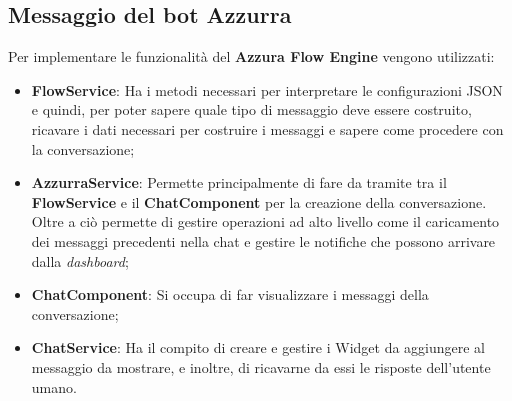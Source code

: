\subsection{Messaggio del bot Azzurra}
Per implementare le funzionalità del \textbf{Azzura Flow Engine} vengono utilizzati:
\begin{itemize}
	\item \textbf{FlowService}: Ha i metodi necessari per interpretare le configurazioni JSON e quindi, per poter sapere quale tipo di messaggio deve essere costruito, ricavare i dati necessari per costruire i messaggi e sapere come procedere con la conversazione;
	\item \textbf{AzzurraService}: Permette principalmente di fare da tramite tra il \textbf{FlowService} e il \textbf{ChatComponent} per la creazione della conversazione. Oltre a ciò permette di gestire operazioni ad alto livello come il caricamento dei messaggi precedenti nella chat e gestire le notifiche che possono arrivare dalla \emph{dashboard};
	\item \textbf{ChatComponent}: Si occupa di far visualizzare i messaggi della conversazione;
	\item \textbf{ChatService}: Ha il compito di creare e gestire i Widget da aggiungere al messaggio da mostrare, e inoltre, di ricavarne da essi le risposte dell'utente umano.
\end{itemize}

